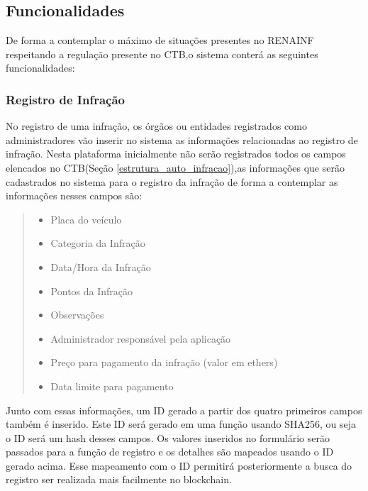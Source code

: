 \subsection{Funcionalidades}

De forma a contemplar o máximo de situações presentes no RENAINF respeitando a regulação presente no CTB,o sistema conterá as seguintes funcionalidades:


    \subsubsection{Registro de Infração}
    
        No registro de uma infração, os órgãos ou entidades registrados como administradores vão inserir no sistema as informações relacionadas ao registro de infração. Nesta plataforma inicialmente não serão registrados todos os campos elencados no CTB(Seção \ref{estrutura_auto_infracao}),as informações que serão cadastrados no sistema para o registro da infração de forma a contemplar as informações nesses campos são:
        
        \begin{quote}
        
            \begin{itemize}
                \item Placa do veículo
                \item Categoria da Infração
                \item Data/Hora da Infração
                \item Pontos da Infração
                \item Observações
                \item Administrador responsável pela aplicação
                \item Preço para pagamento da infração (valor em ethers)
                \item Data limite para pagamento
            \end{itemize}
            
        \end{quote}
        

    
        Junto com essas informações, um ID gerado a partir dos quatro primeiros campos também é inserido. Este ID será gerado em uma função usando SHA256, ou seja o ID será um hash desses campos. Os valores inseridos no formulário serão passados para a função de registro e os detalhes são mapeados usando o ID gerado acima. Esse mapeamento com o ID permitirá posteriormente a busca do  registro ser realizada mais facilmente no blockchain.
        
